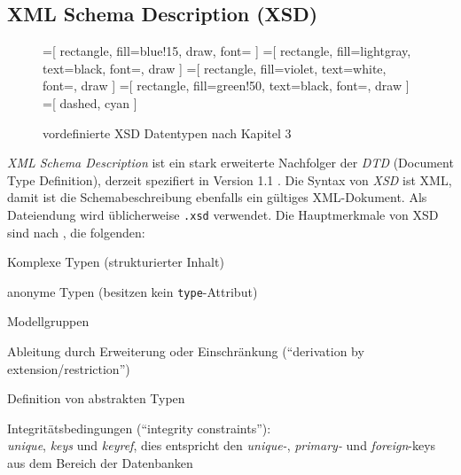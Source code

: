 \subsection{XML Schema Description (XSD)}
\label{sec:xsd}

\begin{figure}[tb]
    \centering
    =[
        rectangle,
        fill={blue!15},
        draw,
        font=\sffamily
    ]      
    =[
        rectangle,
        fill=lightgray,
        text=black,
        font=\sffamily,
        draw
    ]
    =[
        rectangle,
        fill=violet,
        text=white,
        font=\sffamily,
        draw
    ]
    =[
        rectangle,
        fill=green!50,
        text=black,
        font=\sffamily,
        draw
    ]
    =[
        dashed,
        cyan
    ]
    \begin{minipage}[b]{0.45\linewidth}
    \end{minipage}
    \hspace{12pt}
    \begin{minipage}[b]{0.45\linewidth}
    \end{minipage}
    \caption{vordefinierte XSD Datentypen nach \cite{XMLSchema11Specification} Kapitel 3}
    \label{fig:xsddatatypes}
\end{figure}

\emph{XML Schema Description} ist ein stark erweiterte Nachfolger der \emph{DTD} (Document Type Definition), derzeit spezifiert in Version 1.1 \cite{XMLSchema11Specification}. 
Die Syntax von \emph{XSD} ist XML, damit ist die Schemabeschreibung ebenfalls ein gültiges XML-Dokument. Als Dateiendung wird üblicherweise \texttt{.xsd} verwendet.
Die Hauptmerkmale von XSD sind nach \cite{taxonomyXMLSchema} %
, die folgenden:
\begin{compactitem}
    \item Komplexe Typen (strukturierter Inhalt)
    \item anonyme Typen (besitzen kein \texttt{type}-Attribut)
    \item Modellgruppen
    \item Ableitung durch Erweiterung oder Einschränkung (\enquote{derivation by extension/restriction})
    \item Definition von abstrakten Typen
    \item Integritätsbedingungen (\enquote{integrity constraints}):\\
        \emph{unique}, \emph{keys} und \emph{keyref}, dies entspricht den \emph{unique-}, \emph{primary-} und \emph{foreign}-keys aus dem Bereich der Datenbanken
\end{compactitem}

